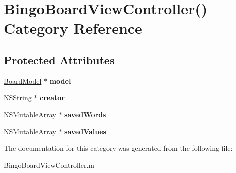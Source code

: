 \hypertarget{category_bingo_board_view_controller_07_08}{\section{Bingo\+Board\+View\+Controller() Category Reference}
\label{category_bingo_board_view_controller_07_08}
}
\subsection*{Protected Attributes}
\begin{DoxyCompactItemize}
\item 
\hypertarget{category_bingo_board_view_controller_07_08_ad4bcc5fe655f47b74e9014a00481819e}{\hyperlink{interface_board_model}{Board\+Model} $\ast$ {\bfseries model}}\label{category_bingo_board_view_controller_07_08_ad4bcc5fe655f47b74e9014a00481819e}

\item 
\hypertarget{category_bingo_board_view_controller_07_08_a2c91e36c21b9b0b9f6ff3b3df8fa8899}{N\+S\+String $\ast$ {\bfseries creator}}\label{category_bingo_board_view_controller_07_08_a2c91e36c21b9b0b9f6ff3b3df8fa8899}

\item 
\hypertarget{category_bingo_board_view_controller_07_08_ae7222718399885e48da556225d2f8122}{N\+S\+Mutable\+Array $\ast$ {\bfseries saved\+Words}}\label{category_bingo_board_view_controller_07_08_ae7222718399885e48da556225d2f8122}

\item 
\hypertarget{category_bingo_board_view_controller_07_08_aeb8ec6dd866a87a3b11cb614d3392c29}{N\+S\+Mutable\+Array $\ast$ {\bfseries saved\+Values}}\label{category_bingo_board_view_controller_07_08_aeb8ec6dd866a87a3b11cb614d3392c29}

\end{DoxyCompactItemize}


The documentation for this category was generated from the following file\+:\begin{DoxyCompactItemize}
\item 
Bingo\+Board\+View\+Controller.\+m\end{DoxyCompactItemize}
